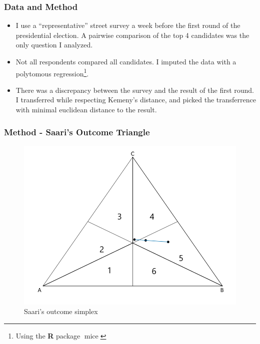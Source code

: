 \documentclass{beamer}
\begin{document}
\begin{frame}
  \frametitle{Data and Method }
  \begin{itemize}
    \item I use a ``representative'' street survey a week before the first round of the presidential election. A pairwise comparison of the top 4 candidates was the only question I analyzed.
    \item Not all respondents compared all candidates. I imputed the data with a
          polytomous regression\footnote{Using the \textbf{\textsf{R}} package
          \(\operatorname{mice}\)}.
    \item There was a discrepancy between the survey and the result of the first
          round. I transferred while respecting Kemeny's distance, and picked
          the transferrence with minimal euclidean distance to the result.
  \end{itemize}
\end{frame}

\begin{frame}
  \frametitle{Method - Saari's Outcome Triangle}
\begin{figure}[H] \centering \includegraphics[width=\textwidth]{../images/simpletriangle.png}
 \caption{Saari's outcome simplex}
 \label{fig:saari_nurmi}
\end{figure}
\end{frame}
\end{document}
